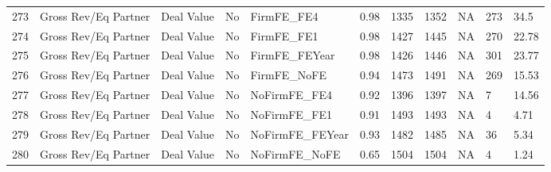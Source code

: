 \begin{table}[ht]
\begin{tabular}{rllllllllll}
  273 & Gross Rev/Eq Partner & Deal Value & No & FirmFE\_FE4 & 0.98 & 1335 & 1352 & NA & 273 & 34.5 \\ 
  274 & Gross Rev/Eq Partner & Deal Value & No & FirmFE\_FE1 & 0.98 & 1427 & 1445 & NA & 270 & 22.78 \\ 
  275 & Gross Rev/Eq Partner & Deal Value & No & FirmFE\_FEYear & 0.98 & 1426 & 1446 & NA & 301 & 23.77 \\ 
  276 & Gross Rev/Eq Partner & Deal Value & No & FirmFE\_NoFE & 0.94 & 1473 & 1491 & NA & 269 & 15.53 \\ 
  277 & Gross Rev/Eq Partner & Deal Value & No & NoFirmFE\_FE4 & 0.92 & 1396 & 1397 & NA & 7 & 14.56 \\ 
  278 & Gross Rev/Eq Partner & Deal Value & No & NoFirmFE\_FE1 & 0.91 & 1493 & 1493 & NA & 4 & 4.71 \\ 
  279 & Gross Rev/Eq Partner & Deal Value & No & NoFirmFE\_FEYear & 0.93 & 1482 & 1485 & NA & 36 & 5.34 \\ 
  280 & Gross Rev/Eq Partner & Deal Value & No & NoFirmFE\_NoFE & 0.65 & 1504 & 1504 & NA & 4 & 1.24 \\ 
   \hline
\end{tabular}
\end{table}
